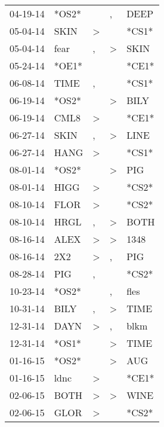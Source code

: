 \begin{supertabular}{lllll}
 04-19-14 &  *OS2* &                  &                , &   DEEP \\
 05-04-14 &   SKIN &     \textgreater &                  &  *CS1* \\
 05-04-14 &   fear &                , &     \textgreater &   SKIN \\
 05-24-14 &  *OE1* &                  &                  &  *CE1* \\
 06-08-14 &   TIME &                , &                  &  *CS1* \\
 06-19-14 &  *OS2* &                  &     \textgreater &   BILY \\
 06-19-14 &   CML8 &     \textgreater &                  &  *CE1* \\
 06-27-14 &   SKIN &                , &     \textgreater &   LINE \\
 06-27-14 &   HANG &     \textgreater &                  &  *CS1* \\
 08-01-14 &  *OS2* &                  &     \textgreater &    PIG \\
 08-01-14 &   HIGG &     \textgreater &                  &  *CS2* \\
 08-10-14 &   FLOR &     \textgreater &                  &  *CS2* \\
 08-10-14 &   HRGL &                , &     \textgreater &   BOTH \\
 08-16-14 &   ALEX &     \textgreater &     \textgreater &   1348 \\
 08-16-14 &    2X2 &     \textgreater &                , &    PIG \\
 08-28-14 &    PIG &                , &                  &  *CS2* \\
 10-23-14 &  *OS2* &                  &                , &   fles \\
 10-31-14 &   BILY &                , &     \textgreater &   TIME \\
 12-31-14 &   DAYN &     \textgreater &                , &   blkm \\
 12-31-14 &  *OS1* &                  &     \textgreater &   TIME \\
 01-16-15 &  *OS2* &                  &     \textgreater &    AUG \\
 01-16-15 &   ldnc &     \textgreater &                  &  *CE1* \\
 02-06-15 &   BOTH &     \textgreater &     \textgreater &   WINE \\
 02-06-15 &   GLOR &     \textgreater &                  &  *CS2* \\

\end{supertabular}
